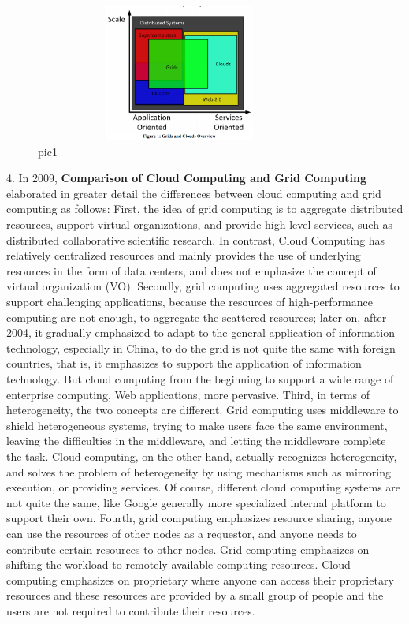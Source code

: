 \documentclass[a4paper,twoside]{scrbook}
\begin{document}
\begin{CJK}{UTF8}{gbsn}
\begin{figure}
\centering
\includegraphics[height=4.5cm,width=9.5cm]{compared.png}
\caption{pic1}
\end{figure}

4. In 2009, \textbf{Comparison of Cloud Computing and Grid Computing}\cite{YJYZ200902020} elaborated in greater detail the differences between cloud computing and grid computing as follows:
First, the idea of grid computing is to aggregate distributed resources, support virtual organizations, and provide high-level services, such as distributed collaborative scientific research. In contrast, Cloud Computing has relatively centralized resources and mainly provides the use of underlying resources in the form of data centers, and does not emphasize the concept of virtual organization (VO).
Secondly, grid computing uses aggregated resources to support challenging applications, because the resources of high-performance computing are not enough, to aggregate the scattered resources; later on, after 2004, it gradually emphasized to adapt to the general application of information technology, especially in China, to do the grid is not quite the same with foreign countries, that is, it emphasizes to support the application of information technology. But cloud computing from the beginning to support a wide range of enterprise computing, Web applications, more pervasive.
Third, in terms of heterogeneity, the two concepts are different. Grid computing uses middleware to shield heterogeneous systems, trying to make users face the same environment, leaving the difficulties in the middleware, and letting the middleware complete the task. Cloud computing, on the other hand, actually recognizes heterogeneity, and solves the problem of heterogeneity by using mechanisms such as mirroring execution, or providing services. Of course, different cloud computing systems are not quite the same, like Google generally more specialized internal platform to support their own.
Fourth, grid computing emphasizes resource sharing, anyone can use the resources of other nodes as a requestor, and anyone needs to contribute certain resources to other nodes. Grid computing emphasizes on shifting the workload to remotely available computing resources. Cloud computing emphasizes on proprietary where anyone can access their proprietary resources and these resources are provided by a small group of people and the users are not required to contribute their resources.

\end{CJK}
\end{document}
